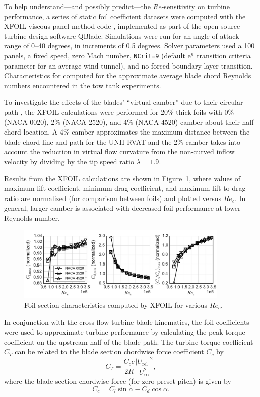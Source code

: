 \documentclass[energies,article,accept,moreauthors,pdftex,12pt,a4paper]{mdpi}
\begin{document}
To help understand---and possibly predict---the $Re$-sensitivity on turbine
performance, a series of static foil coefficient datasets were computed with the
XFOIL viscous panel method code \cite{Drela1989}, implemented as part of the
open source turbine design software QBlade. Simulations were run for an angle of
attack range of 0--40 degrees, in increments of 0.5 degrees. Solver parameters
used a 100 panels, a fixed speed, zero Mach number, \texttt{NCrit=9} (default
$\mathrm{e}^n$ transition criteria parameter for an average wind tunnel), and no
forced boundary layer transition. Characteristics for computed for the
approximate average blade chord Reynolds numbers encountered in the tow tank
experiments.

To investigate the effects of the blades' ``virtual camber'' due to their
circular path \cite{Migliore1980}, the XFOIL calculations were performed for
20\% thick foils with 0\% (NACA 0020), 2\% (NACA 2520), and 4\% (NACA 4520)
camber about their half-chord location. A 4\% camber approximates the maximum
distance between the blade chord line and path for the UNH-RVAT and the 2\%
camber takes into account the reduction in virtual flow curvature from the
non-curved inflow velocity by dividing by the tip speed ratio $\lambda=1.9$.

Results from the XFOIL calculations are shown in Figure~\ref{fig:foil-Re-dep},
where values of maximum lift coefficient, minimum drag coefficient, and maximum
lift-to-drag ratio are normalized (for comparison between foils) and plotted
versus $Re_c$. In general, larger camber is associated with decreased foil
performance at lower Reynolds number.

\begin{figure}[ht!]
\centering
\includegraphics[width=0.9\textwidth]{figures/all_foils_re_dep}
\caption{Foil section characteristics computed by XFOIL for various $Re_c$.}
\label{fig:foil-Re-dep}
\end{figure}

In conjunction with the cross-flow turbine blade kinematics, the foil
coefficients were used to approximate turbine performance by calculating the
peak torque coefficient on the upstream half of the blade path. The turbine
torque coefficient $C_T$ can be related to the blade section chordwise force
coefficient $C_c$ by
\begin{equation}
C_T = \frac{C_c c}{2R} \frac{|U_\mathrm{rel}|^2}{U_\infty^2},
\end{equation}
where the blade section chordwise force (for zero preset pitch) is given by
\begin{equation}
C_c = C_l \sin \alpha - C_d \cos \alpha.
\end{equation}
\end{document}
